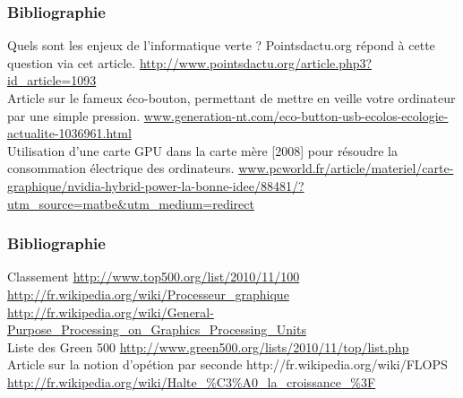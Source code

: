 \documentclass[slidetop,11pt]{beamer}
\begin{document}
\begin{frame} 
\frametitle{Bibliographie}
\begin{thebibliography}{GreenIT}


 Quels sont les enjeux de l'informatique verte ? Pointsdactu.org répond à cette question via cet article. \url{http://www.pointsdactu.org/article.php3?id_article=1093}\\

 Article sur le fameux éco-bouton, permettant de mettre en veille votre ordinateur par une simple pression. \url{www.generation-nt.com/eco-button-usb-ecolos-ecologie-actualite-1036961.html}\\

 Utilisation d'une carte GPU dans la carte mère [2008] pour résoudre la consommation électrique des ordinateurs. \url{www.pcworld.fr/article/materiel/carte-graphique/nvidia-hybrid-power-la-bonne-idee/88481/?utm_source=matbe&utm_medium=redirect}\\


\end{thebibliography}
\end{frame}

\begin{frame} 
\frametitle{Bibliographie}
\begin{thebibliography}{GreenIT}

 Classement \url{http://www.top500.org/list/2010/11/100}\\

 \url{http://fr.wikipedia.org/wiki/Processeur_graphique}\\

 \url{http://fr.wikipedia.org/wiki/General-Purpose_Processing_on_Graphics_Processing_Units}\\

 Liste des Green 500 \url{http://www.green500.org/lists/2010/11/top/list.php}\\

 Article sur la notion d'opétion par seconde \textsf{http://fr.wikipedia.org/wiki/FLOPS}\\

 \url{http://fr.wikipedia.org/wiki/Halte_\%C3\%A0_la_croissance_\%3F}\\

\end{thebibliography}
\end{frame}
\end{document}
